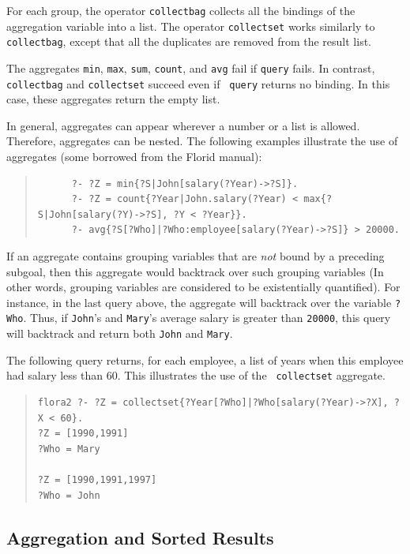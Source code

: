 \documentclass[11pt]{article}
\newcommand{\FLORID}{{\mbox{\sc Florid}}\xspace}
\begin{document}
For each group, the operator {\tt collectbag} collects all the bindings of
the aggregation variable into a list. The operator {\tt collectset} works
similarly to {\tt collectbag}, except that all the duplicates are removed
from the result list.


The aggregates {\tt min}, {\tt max}, {\tt sum}, {\tt count}, and {\tt avg}
fail if {\tt query} fails.
In contrast, {\tt collectbag} and {\tt collectset} succeed even if {\tt
  query} returns no binding. In this case, these aggregates return the
empty list.

In general, aggregates can appear wherever a number or a list is
allowed. Therefore, aggregates can be nested. The following examples
illustrate the use of aggregates (some borrowed from the \FLORID manual):
\begin{quote}
\begin{verbatim}
      ?- ?Z = min{?S|John[salary(?Year)->?S]}.
      ?- ?Z = count{?Year|John.salary(?Year) < max{?S|John[salary(?Y)->?S], ?Y < ?Year}}.
      ?- avg{?S[?Who]|?Who:employee[salary(?Year)->?S]} > 20000. 
\end{verbatim}
\end{quote}
If an aggregate contains grouping variables that are \emph{not} bound
by a preceding subgoal, then this aggregate would backtrack over such
grouping variables (In other words, grouping variables are considered to be
existentially quantified). For instance, in the last query above, the
aggregate will backtrack over the variable {\tt ?Who}. Thus, if
{\tt John}'s and {\tt Mary}'s average salary is greater than {\tt 20000},
this query will backtrack and return both {\tt John} and {\tt Mary}.

The following query returns, for each employee, a list of years when this
employee had salary less than 60. This illustrates the use of the {\tt
  collectset} aggregate.
\begin{quote}
\begin{verbatim}
flora2 ?- ?Z = collectset{?Year[?Who]|?Who[salary(?Year)->?X], ?X < 60}.
?Z = [1990,1991]
?Who = Mary

?Z = [1990,1991,1997]
?Who = John
\end{verbatim}
\end{quote}

\subsection {Aggregation and Sorted Results}
\end{document}
